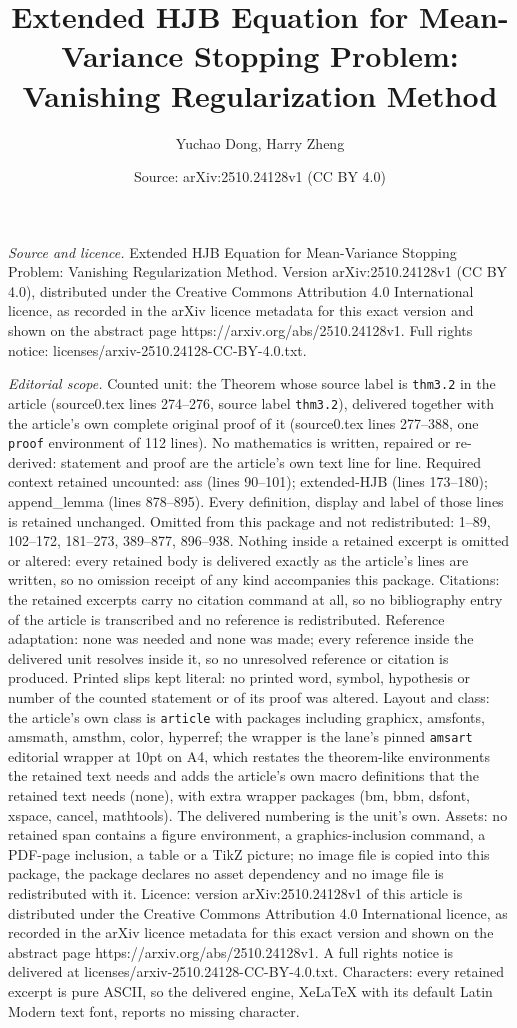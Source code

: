 \documentclass[10pt,a4paper]{amsart}
\title[Extended HJB Equation for Mean-Variance Stopping Problem: Va]{Extended HJB Equation for Mean-Variance Stopping Problem: Vanishing Regularization Method}
\author{Yuchao Dong, Harry Zheng}
\date{Source: arXiv:2510.24128v1 (CC BY 4.0)}
\begin{document}
\maketitle

\noindent\emph{Source and licence.} Extended HJB Equation for Mean-Variance Stopping Problem: Vanishing Regularization Method. Version arXiv:2510.24128v1 (CC BY 4.0), distributed under the Creative Commons Attribution 4.0 International licence, as recorded in the arXiv licence metadata for this exact version and shown on the abstract page https://arxiv.org/abs/2510.24128v1. Full rights notice: licenses/arxiv-2510.24128-CC-BY-4.0.txt.\par\smallskip

\noindent\textit{Editorial scope.} Counted unit: the Theorem whose source label is \texttt{thm3.2} in the article (source0.tex lines 274--276, source label \texttt{thm3.2}), delivered together with the article's own complete original proof of it (source0.tex lines 277--388, one \texttt{proof} environment of 112 lines). No mathematics is written, repaired or re-derived: statement and proof are the article's own text line for line. Required context retained uncounted: ass (lines 90--101); extended-HJB (lines 173--180); append\_lemma (lines 878--895). Every definition, display and label of those lines is retained unchanged. Omitted from this package and not redistributed: 1--89, 102--172, 181--273, 389--877, 896--938. Nothing inside a retained excerpt is omitted or altered: every retained body is delivered exactly as the article's lines are written, so no omission receipt of any kind accompanies this package. Citations: the retained excerpts carry no citation command at all, so no bibliography entry of the article is transcribed and no reference is redistributed. Reference adaptation: none was needed and none was made; every reference inside the delivered unit resolves inside it, so no unresolved reference or citation is produced. Printed slips kept literal: no printed word, symbol, hypothesis or number of the counted statement or of its proof was altered. Layout and class: the article's own class is \texttt{article} with packages including graphicx, amsfonts, amsmath, amsthm, color, hyperref; the wrapper is the lane's pinned \texttt{amsart} editorial wrapper at 10pt on A4, which restates the theorem-like environments the retained text needs and adds the article's own macro definitions that the retained text needs (none), with extra wrapper packages (bm, bbm, dsfont, xspace, cancel, mathtools). The delivered numbering is the unit's own. Assets: no retained span contains a figure environment, a graphics-inclusion command, a PDF-page inclusion, a table or a TikZ picture; no image file is copied into this package, the package declares no asset dependency and no image file is redistributed with it. Licence: version arXiv:2510.24128v1 of this article is distributed under the Creative Commons Attribution 4.0 International licence, as recorded in the arXiv licence metadata for this exact version and shown on the abstract page https://arxiv.org/abs/2510.24128v1. A full rights notice is delivered at licenses/arxiv-2510.24128-CC-BY-4.0.txt. Characters: every retained excerpt is pure ASCII, so the delivered engine, XeLaTeX with its default Latin Modern text font, reports no missing character.
\end{document}
